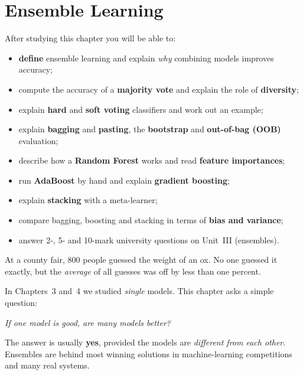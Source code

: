 \chapter{Ensemble Learning}
\label{ch:ensemble}
\begin{objectives}
After studying this chapter you will be able to:
\begin{itemize}
  \item \textbf{define} ensemble learning and explain \emph{why} combining models improves accuracy;
  \item compute the accuracy of a \textbf{majority vote} and explain the role of \textbf{diversity};
  \item explain \textbf{hard} and \textbf{soft voting} classifiers and work out an example;
  \item explain \textbf{bagging} and \textbf{pasting}, the \textbf{bootstrap} and \textbf{out-of-bag (OOB)} evaluation;
  \item describe how a \textbf{Random Forest} works and read \textbf{feature importances};
  \item run \textbf{AdaBoost} by hand and explain \textbf{gradient boosting};
  \item explain \textbf{stacking} with a meta-learner;
  \item compare bagging, boosting and stacking in terms of \textbf{bias and variance};
  \item answer 2-, 5- and 10-mark university questions on Unit~III (ensembles).
\end{itemize}
\end{objectives}

\begin{pullquote}
At a county fair, 800 people guessed the weight of an ox. No one guessed it exactly, but the \emph{average} of all guesses was off by less than one percent.
\end{pullquote}

In Chapters~3 and~4 we studied \emph{single} models. This chapter asks a simple question:

\begin{center}
\emph{If one model is good, are many models better?}
\end{center}

The answer is usually \textbf{yes}, provided the models are \emph{different from each other}. Ensembles are behind most winning solutions in machine-learning competitions and many real systems.

